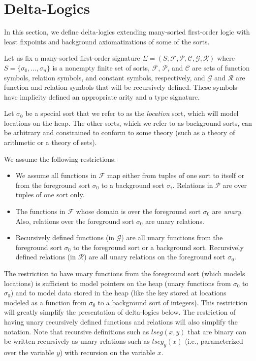 \section{Delta-Logics}
\label{sec:delta-logics}

In this section, we define delta-logics extending many-sorted first-order logic with least fixpoints
and background axiomatizations of some of the sorts.

Let us fix a many-sorted first-order signature $\Sigma = (S, \mathcal{F}, \mathcal{P}, \mathcal{C}, \mathcal{G}, \mathcal{R})$ where 
$S=\{\sigma_0, \ldots, \sigma_n\}$ is a nonempty finite set of sorts, 
$\mathcal{F}$, $\mathcal{P}$, and $\mathcal{C}$ are sets of function symbols, relation symbols,
and constant symbols, respectively, and
$\mathcal{G}$ and $\mathcal{R}$ are function and relation symbols that will be recursively defined. 
These symbols have implicity defined an appropriate arity and a type signature.


Let $\sigma_0$ be a special sort that we refer to as the \emph{location} sort, which
will model locations on the heap. The other sorts, which we refer to as background sorts, can be arbitrary and
constrained to conform to some theory (such as a theory of arithmetic or a theory of sets).

We assume the following restrictions:
\begin{itemize}
	\item We assume all functions in $\mathcal{F}$ map either from tuples of one sort to itself or from the foreground
	 sort $\sigma_0$ to a background sort $\sigma_i$. Relations in $\mathcal{P}$ are over tuples of one sort only.
	\item The functions in $\mathcal{F}$ whose domain is over the foreground sort $\sigma_0$ are \emph{unary}.
	      Also, relations over the foreground sort $\sigma_0$ are unary relations.
	\item Recursively defined functions (in $\mathcal{G}$) are all unary functions from the foreground sort $\sigma_0$ 
	         to the foreground sort or a background sort. Recursively defined relations (in $\mathcal{R}$) are all unary relations on the foreground sort $\sigma_0$.
\end{itemize}

The restriction to have unary functions from the foreground sort (which models locations) is sufficient
to model pointers on the heap (unary functions from $\sigma_0$ to $\sigma_0$) 
and to model data stored in the heap (like the key stored at locations modeled as a function from $\sigma_0$ to a
background sort of integers).
This restriction will greatly simplify the presentation of delta-logics below.
The restriction of having unary recursively defined functions and relations will also simplify the notation.
Note that recursive definitions such as $\textit{lseg}(x,y)$ that are binary can be written recursively
as unary relations such as $\textit{lseg}_y(x)$ (i.e., parameterized over the variable $y$) with recursion
on the variable $x$. 

